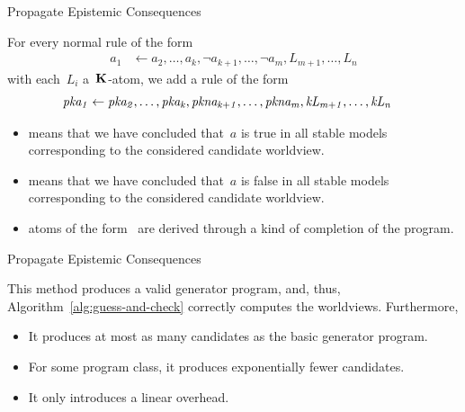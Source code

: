\documentclass[aspectratio=169,svgnames,xcolor=table,t]{beamer}
\begin{document}
\begin{frame}{Propagate Epistemic Consequences}
    \begin{myitemize}
        \item[] For every normal rule of the form
        \begin{align}
            a_1 &\leftarrow 
            a_2,\!\dotsc\!,a_k,
            \neg a_{k+1},\!\dotsc\!,\neg a_m,
            {L_{m+1}},\!\dotsc\!,{L_n}
        \end{align}
        with each~$L_i$ a~$\mathbf{K}$-atom, we add a rule of the form
        \begin{gather}
            \begin{aligned}
                \kp{a_1} &\span\span\leftarrow 
                \kp{a_2},\dotsc,\kp{a_k},
                \kpnott{a_{k+1}},\dotsc,\kpnott{a_m},
                \kk{L_{m+1}},\dotsc,\kk{L_n}
            \end{aligned}
        \end{gather}
        \vspace*{-15pt}
        \begin{itemize}
            \item {} means that we have concluded that~$a$ is true in all stable models corresponding to the considered candidate worldview.
            \item {} means that we have concluded that~$a$ is false in all stable models corresponding to the considered candidate worldview.
            \item atoms of the form~ are derived through a kind of completion of the program.
        \end{itemize}
    \end{myitemize}
\end{frame}
\begin{frame}[c]{Propagate Epistemic Consequences}
    \begin{theorem}
        This method produces a valid generator program, and, thus, Algorithm~\ref{alg:guess-and-check} correctly computes the worldviews.
        Furthermore,
        \begin{itemize}
            \item It produces at most as many candidates as the basic generator program.
            \item For some program class, it produces exponentially fewer candidates.
            \item It only introduces a linear overhead.
        \end{itemize}
    \end{theorem}
\end{frame}


\frame{\backcoverpage}
\end{document}
